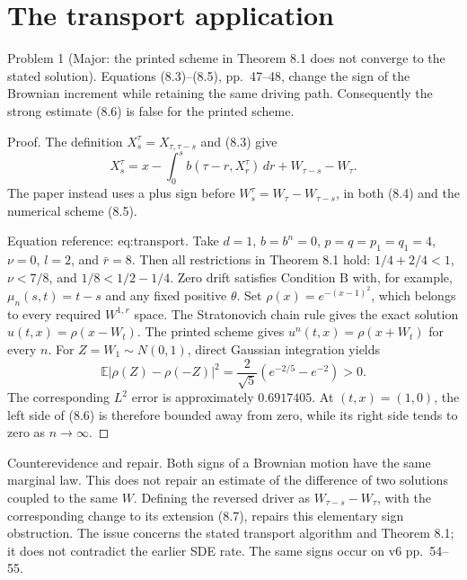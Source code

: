 \documentclass[10pt]{article}
\begin{document}
\section*{The transport application}
Problem 1 (Major: the printed scheme in Theorem 8.1 does not converge to the stated solution).  Equations (8.3)–(8.5), pp. 47–48, change the sign of the Brownian increment while retaining the same driving path. Consequently the strong estimate (8.6) is false for the printed scheme.\par
Proof. The definition \(X_s^\tau=X_{\tau,\tau-s}\) and (8.3) give \[X_s^\tau=x-\int_0^s b(\tau-r,X_r^\tau)\,dr+W_{\tau-s}-W_\tau.\] The paper instead uses a plus sign before \(W_s^\tau=W_\tau-W_{\tau-s}\), in both (8.4) and the numerical scheme (8.5).\par
Equation reference: eq:transport. Take \(d=1\), \(b=b^n=0\), \(p=q=p_1=q_1=4\), \(\nu=0\), \(l=2\), and \(\bar r=8\). Then all restrictions in Theorem 8.1 hold: \(1/4+2/4<1\), \(\nu<7/8\), and \(1/8<1/2-1/4\). Zero drift satisfies Condition B with, for example, \(\mu_n(s,t)=t-s\) and any fixed positive \(\theta\). Set \(\rho(x)=e^{-(x-1)^2}\), which belongs to every required \(W^{1,r}\) space. The Stratonovich chain rule gives the exact solution \(u(t,x)=\rho(x-W_t)\). The printed scheme gives \(u^n(t,x)=\rho(x+W_t)\) for every \(n\). For \(Z=W_1\sim N(0,1)\), direct Gaussian integration yields \[
\mathbb E|\rho(Z)-\rho(-Z)|^2
=\frac{2}{\sqrt5}\left(e^{-2/5}-e^{-2}\right)>0.\] The corresponding \(L^2\) error is approximately \(0.6917405\). At \((t,x)=(1,0)\), the left side of (8.6) is therefore bounded away from zero, while its right side tends to zero as \(n\to\infty\). ◻\par
Counterevidence and repair. Both signs of a Brownian motion have the same marginal law. This does not repair an estimate of the difference of two solutions coupled to the same \(W\). Defining the reversed driver as \(W_{\tau-s}-W_\tau\), with the corresponding change to its extension (8.7), repairs this elementary sign obstruction. The issue concerns the stated transport algorithm and Theorem 8.1; it does not contradict the earlier SDE rate. The same signs occur on v6 pp. 54–55.\par
\end{document}
